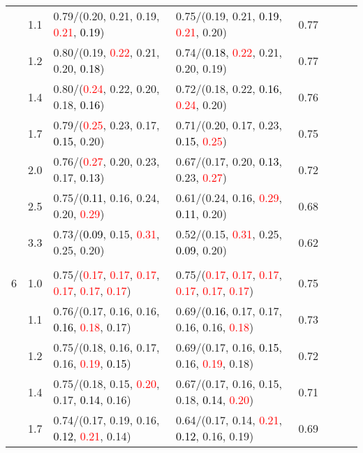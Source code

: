 \documentclass[10pt,a4paper]{report}
\begin{document}
\begin{table}[!htbp]
\begin{center}
{\begin{tabular}{ccllcccc}
			&1.1&0.79/(0.20, 0.21, 0.19, \textcolor{red}{0.21}, \textcolor{black}{0.19})&0.75/(0.19, 0.21, \textcolor{black}{0.19}, \textcolor{red}{0.21}, 0.20)&0.77\\
			&1.2&0.80/(0.19, \textcolor{red}{0.22}, 0.21, 0.20, \textcolor{black}{0.18})&0.74/(\textcolor{black}{0.18}, \textcolor{red}{0.22}, 0.21, 0.20, 0.19)&0.77\\
			&1.4&0.80/(\textcolor{red}{0.24}, 0.22, 0.20, 0.18, \textcolor{black}{0.16})&0.72/(0.18, 0.22, \textcolor{black}{0.16}, \textcolor{red}{0.24}, 0.20)&0.76\\
			&1.7&0.79/(\textcolor{red}{0.25}, 0.23, 0.17, \textcolor{black}{0.15}, 0.20)&0.71/(0.20, 0.17, 0.23, \textcolor{black}{0.15}, \textcolor{red}{0.25})&0.75\\
			&2.0&0.76/(\textcolor{red}{0.27}, 0.20, 0.23, 0.17, \textcolor{black}{0.13})&0.67/(0.17, 0.20, \textcolor{black}{0.13}, 0.23, \textcolor{red}{0.27})&0.72\\
			&2.5&0.75/(\textcolor{black}{0.11}, 0.16, 0.24, 0.20, \textcolor{red}{0.29})&0.61/(0.24, 0.16, \textcolor{red}{0.29}, \textcolor{black}{0.11}, 0.20)&0.68\\
			&3.3&0.73/(\textcolor{black}{0.09}, 0.15, \textcolor{red}{0.31}, 0.25, 0.20)&0.52/(0.15, \textcolor{red}{0.31}, 0.25, \textcolor{black}{0.09}, 0.20)&0.62\\
			&&&&\\
			6			&1.0&0.75/(\textcolor{red}{0.17}, \textcolor{red}{0.17}, \textcolor{red}{0.17}, \textcolor{red}{0.17}, \textcolor{red}{0.17}, \textcolor{red}{0.17})&0.75/(\textcolor{red}{0.17}, \textcolor{red}{0.17}, \textcolor{red}{0.17}, \textcolor{red}{0.17}, \textcolor{red}{0.17}, \textcolor{red}{0.17})&0.75\\
			&1.1&0.76/(0.17, 0.16, 0.16, \textcolor{black}{0.16}, \textcolor{red}{0.18}, 0.17)&0.69/(\textcolor{black}{0.16}, 0.17, 0.17, 0.16, 0.16, \textcolor{red}{0.18})&0.73\\
			&1.2&0.75/(0.18, 0.16, 0.17, 0.16, \textcolor{red}{0.19}, \textcolor{black}{0.15})&0.69/(0.17, 0.16, \textcolor{black}{0.15}, 0.16, \textcolor{red}{0.19}, 0.18)&0.72\\
			&1.4&0.75/(0.18, 0.15, \textcolor{red}{0.20}, 0.17, \textcolor{black}{0.14}, 0.16)&0.67/(0.17, 0.16, 0.15, 0.18, \textcolor{black}{0.14}, \textcolor{red}{0.20})&0.71\\
			&1.7&0.74/(0.17, 0.19, 0.16, \textcolor{black}{0.12}, \textcolor{red}{0.21}, 0.14)&0.64/(0.17, 0.14, \textcolor{red}{0.21}, \textcolor{black}{0.12}, 0.16, 0.19)&0.69\\

\end{tabular}}
\end{center}
\end{table}
\end{document}
